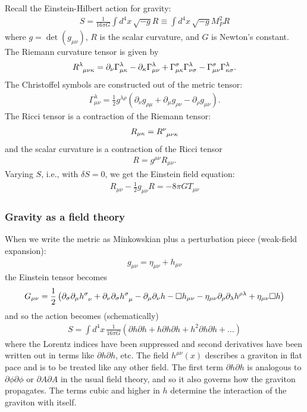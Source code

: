 \documentclass{book}
\theoremstyle{definition}
\newcommand{\p}{\partial}
\newcommand{\f}[2]{\frac{#1}{#2}}
\newcommand{\lp}{\left(}
\newcommand{\rp}{\right)}
\begin{document}
Recall the Einstein-Hilbert action for gravity:
\begin{align}
S = \f{1}{16\pi G}\int d^4x\,\sqrt{-g}R \equiv \int d^4x\,\sqrt{-g}M_P^2 R
\end{align}
where $g = \det(g_{\mu\nu})$, $R$ is the scalar curvature, and $G$ is Newton's constant. \\

The Riemann curvature tensor is given by
\begin{align}
\tensor{R}{^\lambda_{\mu\nu\kappa}} = \p_\nu \Gamma^\lambda_{\mu\kappa} - \p_\kappa\Gamma^\lambda_{\mu\nu} + \Gamma^\sigma_{\mu\kappa}\Gamma^\lambda_{\nu\sigma} - \Gamma^\sigma_{\mu\nu}\Gamma^\lambda_{\kappa\sigma}.
\end{align}
The Christoffel symbols are constructed out of the metric tensor:
\begin{align}
\Gamma^\lambda_{\mu\nu} = \f{1}{2}g^{\lambda\rho}(\p_\nu g_{\rho\mu} + \p_\mu g_{\rho\nu} - \p_\rho g_{\mu\nu}).
\end{align}
The Ricci tensor is a contraction of the Riemann tensor:
\begin{align}
R_{\mu\kappa} = \tensor{R}{^\nu_{\mu\nu\kappa}}
\end{align}
and the scalar curvature is a contraction of the Ricci tensor
\begin{align}
R = g^{\mu\nu}R_{\mu\nu}.
\end{align}
Varying $S$, i.e., with $\delta S = 0$, we get the Einstein field equation:
\begin{align}
R_{\mu\nu} - \f{1}{2}g_{\mu\nu}R = -8\pi GT_{\mu\nu}
\end{align}
     


\subsubsection{Gravity as a field theory}
When we write the metric as Minkowskian plus a perturbation piece (weak-field expansion):
\begin{align}
g_{\mu\nu} = \eta_{\mu\nu} + h_{\mu\nu}
\end{align}    
the Einstein tensor becomes
\begin{align}
G_{\mu\nu} = \f{1}{2}\lp  \p_\sigma\p_\mu \tensor{h}{^\sigma_\nu} + \p_\nu \p_\sigma \tensor{h}{^\sigma_\mu}- \p_\mu\p_\nu h - \square h_{\mu\nu} - \eta_{\mu\nu}\p_\rho\p_\lambda h^{\rho\lambda} + \eta_{\mu\nu}\square h  \rp
\end{align}
and so the action becomes (schematically)
\begin{align}
S = \int d^4x\, \f{1}{16\pi G}(\p h \p h + h\p h \p h + h^2\p h \p h + \dots)
\end{align}
where the Lorentz indices have been suppressed and second derivatives have been written out in terms like $\p h \p h$, etc. The field $h^{\mu\nu}(x)$ describes a graviton in flat pace and is to be treated like any other field. The first term $\p h \p h$ is analogous to $\p \phi \p \phi$ or $\p A \p A$ in the usual field theory, and so it also governs how the graviton propagates. The terms cubic and higher in $h$ determine the interaction of the graviton with itself. \\
\end{document}

